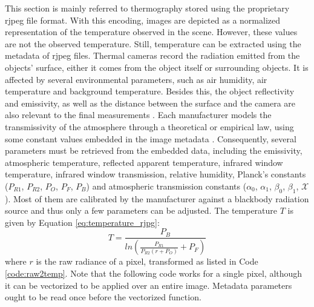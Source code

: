 This section is mainly referred to thermography stored using the proprietary \acrshort{rjpeg} file format. With this encoding, images are depicted as a normalized representation of the temperature observed in the scene. However, these values are not the observed temperature. Still, temperature can be extracted using the metadata of \acrshort{rjpeg} files. Thermal cameras record the radiation emitted from the objects' surface, either it comes from the object itself or surrounding objects. It is affected by several environmental parameters, such as air humidity, air temperature and background temperature. Besides this, the object reflectivity and emissivity, as well as the distance between the surface and the camera are also relevant to the final measurements \cite{vollmer_infrared_2017}. Each manufacturer models the transmissivity of the atmosphere through a theoretical or empirical law, using some constant values embedded in the image metadata \cite{teza_evaluation_2019}. Consequently, several parameters must be retrieved from the embedded data, including the emissivity, atmospheric temperature, reflected apparent temperature, infrared window temperature, infrared window transmission, relative humidity, Planck's constants ($P_{R1}$, $P_{R2}$, $P_O$, $P_F$, $P_B$) and atmospheric transmission constants ($\alpha_0$, $\alpha_1$, $\beta_0$, $\beta_1$, $\mathcal{X}$). Most of them are calibrated by the manufacturer against a blackbody radiation source and thus only a few parameters can be adjusted. The temperature $T$ is given by Equation \ref{eq:temperature_rjpg}:
\begin{equation}
    \label{eq:temperature_rjpg}
    T = \frac{P_B}{ln\left(\frac{P_{R1}}{P_{R2} (\textit{r} + P_O)} + P_F\right)}
\end{equation}
where $\textit{r}$ is the raw radiance of a pixel, transformed as listed in Code \ref{code:raw2temp}. Note that the following code works for a single pixel, although it can be vectorized to be applied over an entire image. Metadata parameters ought to be read once before the vectorized function.

